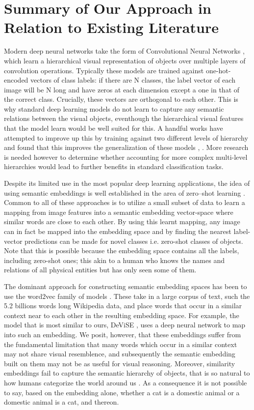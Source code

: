 \documentclass[12pt]{report}
\begin{document}
\section{Summary of Our Approach in Relation to Existing Literature}
Modern deep neural networks take the form of Convolutional Neural Networks \cite{Lecun2015}, which learn a hierarchical visual representation of objects over multiple layers of convolution operations. Typically these models are trained against one-hot-encoded vectors of class labels: if there are N classes, the label vector of each image will be N long and have zeros at each dimension except a one in that of the correct class. Crucially, these vectors are orthogonal to each other. This is why standard deep learning models do not learn to capture any semantic relations between the visual objects, eventhough the hierarchical visual features that the model learn would be well suited for this. A handful works have attempted to improve up this by training against two different levels of hierarchy and found that this improves the generalization of these models \cite{Wang2015}, \cite{Peterson2018}. More research is needed however to determine whether accounting for more complex multi-level hierarchies would lead to further benefits in standard classification tasks.

Despite its limited use in the most popular deep learning applications, the idea of using semantic embeddings is well established in the area of zero--shot learning \cite{Palatucci2009, Socher, Huang2012, Frome2013, Norouzi2013}. Common to all of these approaches is to utilize a small subset of data to learn a mapping from image features into a semantic embedding vector-space where similar words are close to each other. By using this learnt mapping, any image can in fact be mapped into the embedding space and by finding the nearest label-vector predictions can be made for novel classes i.e. zero-shot classes of objects. Note that this is possible because the embedding space contains all the labels, including zero-shot ones; this akin to a human who knows the names and relations of all physical entities but has only seen some of them.

The dominant approach for constructing semantic embedding spaces has been to use the word2vec family of models \cite{Mikolov, Mikolov2013}. These take in a large corpus of text, such the 5.2 billions words long Wikipedia data, and place words that occur in a similar context near to each other in the resulting embedding space. For example, the model that is most similar to ours, DeViSE \cite{Frome2013}, uses a deep neural network to map into such an embedding. We posit, however, that these embeddings suffer from the fundamental limitation that many words which occur in a similar context may not share visual resemblence, and subsequently the semantic embedding built on them may not be as useful for visual reasoning. Moreover, similarity embeddings fail to capture the semantic hierarchy of objects, that is so natural to how humans categorize the world around us \cite{Rosch1976}. As a consequence it is not possible to say, based on the embedding alone, whether a cat is a domestic animal or a domestic animal is a cat, and thereon. 
\end{document}
